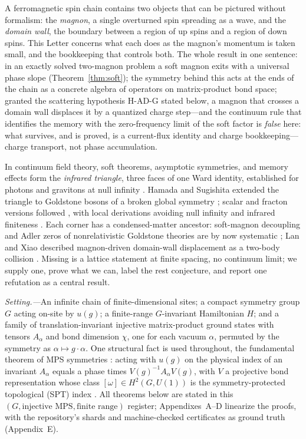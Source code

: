 \documentclass[aps,prl,twocolumn,superscriptaddress,longbibliography,floatfix]{revtex4-2}
\begin{document}
A ferromagnetic spin chain contains two objects that can be pictured without
formalism: the \emph{magnon}, a single overturned spin spreading as a wave,
and the \emph{domain wall}, the boundary between a region of up spins and a
region of down spins. This Letter concerns what each does as the
magnon's momentum is taken small, and the bookkeeping that controls
both.
The whole result in one sentence: in an exactly solved two-magnon problem
a soft magnon exits with a universal phase slope
(Theorem~\ref{thm:soft}); the symmetry behind this
acts at the ends of the chain as a concrete algebra of operators on
matrix-product bond space; granted the scattering hypothesis H-AD-G
stated below, a magnon that crosses a domain wall
displaces it by a quantized charge step---and the continuum rule that
identifies the memory with the zero-frequency limit of the soft factor is
\emph{false} here: what survives, and is proved, is a current-flux identity
and charge bookkeeping---charge transport, not phase accumulation.

In continuum field theory, soft theorems, asymptotic symmetries, and memory
effects form the \emph{infrared triangle}, three faces of one Ward identity,
established for photons and gravitons at null infinity
\cite{Strominger2017,Strominger2014}. Hamada and Sugishita extended the
triangle to Goldstone bosons of a broken global symmetry \cite{Hamada2017};
scalar and fracton versions followed
\cite{Campiglia2017,Perez2022,Perez2023}, with local derivations
avoiding null infinity \cite{DeLuca2024} and infrared finiteness
\cite{Prabhu2022}. Each corner has a
condensed-matter ancestor: soft-magnon decoupling and Adler zeros of
nonrelativistic Goldstone theories are by now systematic
\cite{WatanabeMurayama2012,Mojahed2021,Cheung2023,Gongyo2016}; Lan and
Xiao described magnon-driven domain-wall displacement as a two-body
collision \cite{Lan2021,Kim2014}. Missing is a lattice statement at
finite spacing, no continuum limit; we supply one, prove what we can,
label the rest conjecture, and report one refutation as a central
result.

\emph{Setting.---}An infinite chain of finite-dimensional sites; a compact
symmetry group $G$ acting on-site by $u(g)$; a finite-range $G$-invariant
Hamiltonian $H$; and a family of translation-invariant injective
matrix-product ground states with tensors $A_\alpha$ and bond dimension
$\chi$, one for each vacuum $\alpha$, permuted by the symmetry as
$\alpha\mapsto g\cdot\alpha$. One structural fact is used throughout, the
fundamental theorem of MPS symmetries \cite{PerezGarcia2008,Cirac2020}:
acting with $u(g)$ on the physical index of an invariant $A_\alpha$
equals a phase times $V(g)^{-1}A_\alpha V(g)$, with $V$ a projective bond
representation whose class $[\omega]\in H^{2}(G,U(1))$ is the
symmetry-protected topological (SPT) index
\cite{PerezGarcia2008,Williamson2014}. All theorems below are stated in this
$(G,\text{injective MPS},\text{finite range})$ register; Appendixes~A--D
linearize the proofs, with the repository's shards and machine-checked
certificates as ground truth (Appendix~E).
\end{document}
